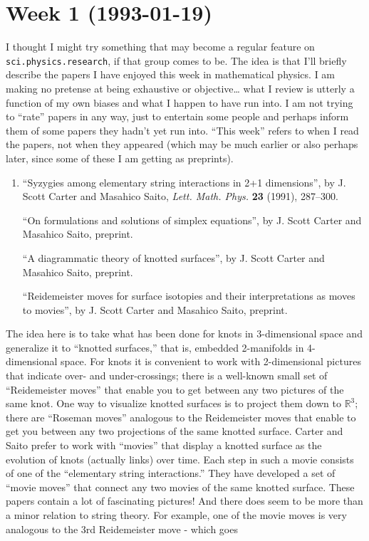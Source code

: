 \documentclass{article}
\begin{document}
\hypertarget{week-1-1993-01-19}{%
\section{Week 1 (1993-01-19)}\label{week-1-1993-01-19}}

I thought I might try something that may become a regular feature on
\texttt{sci.physics.research}, if that group comes to be. The idea is
that I'll briefly describe the papers I have enjoyed this week in
mathematical physics. I am making no pretense at being exhaustive or
objective\ldots{} what I review is utterly a function of my own biases
and what I happen to have run into. I am not trying to ``rate'' papers
in any way, just to entertain some people and perhaps inform them of
some papers they hadn't yet run into. ``This week'' refers to when I
read the papers, not when they appeared (which may be much earlier or
also perhaps later, since some of these I am getting as preprints).

\begin{enumerate}
\def\labelenumi{\arabic{enumi})}
\item
  ``Syzygies among elementary string interactions in 2+1 dimensions'',
  by J. Scott Carter and Masahico Saito, \emph{Lett. Math. Phys.}
  \textbf{23} (1991), 287--300.

  ``On formulations and solutions of simplex equations'', by J. Scott
  Carter and Masahico Saito, preprint.

  ``A diagrammatic theory of knotted surfaces'', by J. Scott Carter and
  Masahico Saito, preprint.

  ``Reidemeister moves for surface isotopies and their interpretations
  as moves to movies'', by J. Scott Carter and Masahico Saito, preprint.
\end{enumerate}

The idea here is to take what has been done for knots in 3-dimensional
space and generalize it to ``knotted surfaces,'' that is, embedded
2-manifolds in 4-dimensional space. For knots it is convenient to work
with 2-dimensional pictures that indicate over- and under-crossings;
there is a well-known small set of ``Reidemeister moves'' that enable
you to get between any two pictures of the same knot. One way to
visualize knotted surfaces is to project them down to \(\mathbb{R}^3\);
there are ``Roseman moves'' analogous to the Reidemeister moves that
enable to get you between any two projections of the same knotted
surface. Carter and Saito prefer to work with ``movies'' that display a
knotted surface as the evolution of knots (actually links) over time.
Each step in such a movie consists of one of the ``elementary string
interactions.'' They have developed a set of ``movie moves'' that
connect any two movies of the same knotted surface. These papers contain
a lot of fascinating pictures! And there does seem to be more than a
minor relation to string theory. For example, one of the movie moves is
very analogous to the 3rd Reidemeister move - which goes
\end{document}

